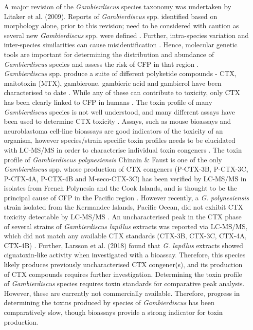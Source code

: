 \documentclass[10pt,letterpaper]{article}
\begin{document}
A major revision of the \emph{Gambierdiscus} species taxonomy was undertaken by Litaker et al. (2009). 
Reports of \emph{Gambierdiscus} spp. identified based on morphology alone, prior to this revision; need to be considered with caution as several new \emph{Gambierdiscus} spp. were defined \cite{holmes1990toxicity,holmes1991strain,holmes1994purification}. 
Further, intra-species variation and inter-species similarities can cause misidentification \citep{bravo2014cellular,kretzschmar2017characterization,kohli2014high}. 
Hence, molecular genetic tools are important for determining the distribution and abundance of  \textit{Gambierdiscus} species and assess the risk of CFP in that region \citep{kohli2014high,kretzschmar2017characterization}. \\

\emph{Gambierdiscus} spp. produce a suite of different polyketide compounds - CTX, maitotoxin (MTX), gambierone, gambieric acid and gambierol have been characterised to date \citep{satake1993gambierol,nagai1992gambieric,rodriguez2015gambierone,murata1993structure,murata1989structures}. 
While any of these can contribute to toxicity, only CTX has been clearly linked to CFP in humans \citep{chinain1997intraspecific,holmes1998gambierdiscus}. 
The toxin profile of many \textit{Gambierdiscus} species is not well understood, and many different assays have been used to determine CTX toxicity \citep{globalcig}. 
Assays, such as mouse bioassays and neuroblastoma cell-line bioassays are good indicators of the toxicity of an organism, however species/strain specific toxin profiles needs to be elucidated with LC-MS/MS in order to characterise individual toxin congeners \citep{diogened2014chemistry}. 
The toxin profile of \textit{Gambierdiscus polynesiensis} Chinain \& Faust is one of the only \emph{Gambierdiscus} spp.
whose production of CTX congeners (P-CTX-3B, P-CTX-3C, P-CTX-4A, P-CTX-4B and M-seco-CTX-3C) has been verified by LC-MS/MS in isolates from French Polynesia and the Cook Islands, and is thought to be the principal cause of CFP in the Pacific region \citep{chinain2010growth,rhodes2014production}. 
However recently, a \emph{G. polynesiensis} strain isolated from the Kermandec Islands, Pacific Ocean, did not exhibit CTX toxicity detectable by LC-MS/MS  \citep{rhodes2017epiphytic}.
An uncharacterised peak in the CTX phase of several strains of \emph{Gambierdiscus lapillus} extracts was reported via LC-MS/MS, which did not match any available CTX standards (CTX-3B, CTX-3C, CTX-4A, CTX-4B) \citep{kretzschmar2017characterization}. 
Further, Larsson et al. (2018) found that \emph{G. lapillus} extracts showed ciguatoxin-like activity when investigated with a bioassay. 
Therefore, this species likely produces previously uncharacterised CTX congener(s), and its production of CTX compounds requires further investigation.
Determining the toxin profile of \textit{Gambierdiscus} species requires toxin standards for comparative peak analysis. 
However, these are currently not commercially available. 
Therefore, progress in determining the toxins produced by species of \emph{Gambierdiscus} has been comparatively slow, though bioassays provide a strong indicator for toxin production.\\
\end{document}
